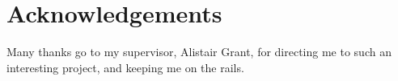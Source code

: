\documentclass[a4paper,12pt]{article}
\begin{document}
  \section*{Acknowledgements}
    Many thanks go to my supervisor, Alistair Grant, for directing me to such an interesting project, and keeping me on the rails.
  \pagestyle{empty}
  \pagebreak
  \pagestyle{plain}
  \setcounter{page}{1}
  
  
  
  
  
  
  \pagebreak
  \pagestyle{empty}
  \nocite{opencvcheatsheet}
  
  
\end{document}
